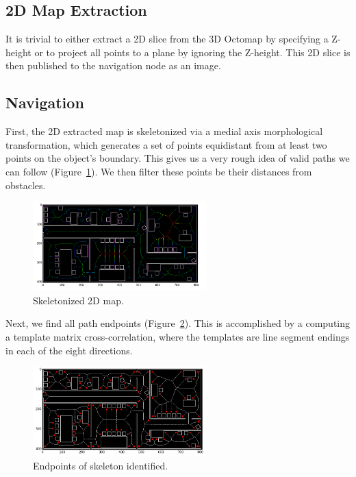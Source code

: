 \documentclass[12pt,letterpaper]{article} \usepackage[margin=1in]{geometry}
\begin{document}
\subsection*{2D Map Extraction}

It is trivial to either extract a 2D slice from the 3D Octomap by specifying
a Z-height or to project all points to a plane by ignoring the Z-height. This
2D slice is then published to the navigation node as an image.


\subsection*{Navigation}

First, the 2D extracted map is skeletonized via a medial axis morphological
transformation, which generates a set of points equidistant from at least two
points on the object’s boundary. This gives us a very rough idea of valid paths
we can follow (Figure~\ref{fig:medial_axis}). We then filter these points be
their distances from obstacles.

\begin{figure}[!h]
	\centering
	\includegraphics[width=0.6\textwidth]{img/medial_axis.png}
	\caption{Skeletonized 2D map.}
	\label{fig:medial_axis}
\end{figure}

Next, we find all path endpoints (Figure~\ref{fig:identify_endpoints}). This is
accomplished by a computing a template matrix cross-correlation, where the
templates are line segment endings in each of the eight directions.

\begin{figure}[!h]
	\centering
	\includegraphics[width=0.6\textwidth]{img/identify_endpoints.png}
	\caption{Endpoints of skeleton identified.}
	\label{fig:identify_endpoints}
\end{figure}
\end{document}
